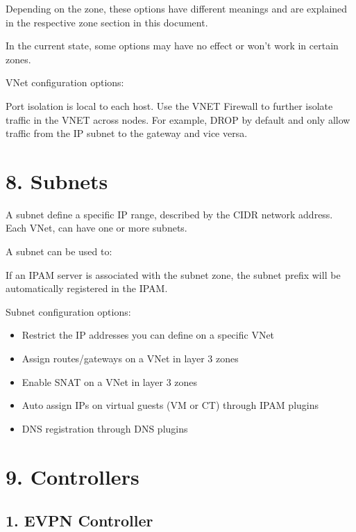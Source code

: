 Depending on the zone, these options have different meanings and are explained in the respective zone section in this document.

In the current state, some options may have no effect or won’t work in certain zones.

VNet configuration options:

Port isolation is local to each host. Use the VNET Firewall to further isolate traffic in the VNET across nodes. For example, DROP by default and only allow traffic from the IP subnet to the gateway and vice versa.


\section{8. Subnets}

A subnet define a specific IP range, described by the CIDR network address. Each VNet, can have one or more subnets.

A subnet can be used to:

If an IPAM server is associated with the subnet zone, the subnet prefix will be automatically registered in the IPAM.

Subnet configuration options:

\begin{itemize}[leftmargin=2cm]

	\item Restrict the IP addresses you can define on a specific VNet

	\item Assign routes/gateways on a VNet in layer 3 zones

	\item Enable SNAT on a VNet in layer 3 zones

	\item Auto assign IPs on virtual guests (VM or CT) through IPAM plugins

	\item DNS registration through DNS plugins

\end{itemize}


\section{9. Controllers}

\subsection{1. EVPN Controller}

